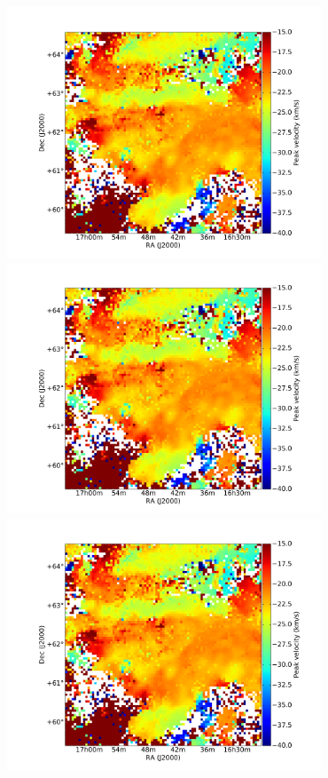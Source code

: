 \documentclass[traditabstract]{aa}
\begin{document}
\begin{figure}[h]
  \centering
  \includegraphics[page=1,height=7.5cm,trim=110 35 105 75,clip=true]{Figures/Phases_GHIGLS/GHIGLS_velo.pdf}
  \hspace{5mm}
  \includegraphics[page=4,height=7.5cm,trim=110 35 105 75,clip=true]{Figures/Phases_GHIGLS/GHIGLS_velo.pdf} \\
  \vspace{5mm}
  \includegraphics[page=2,height=7.5cm,trim=110 35 105 75,clip=true]{Figures/Phases_GHIGLS/GHIGLS_velo.pdf}

\end{figure}
\end{document}
